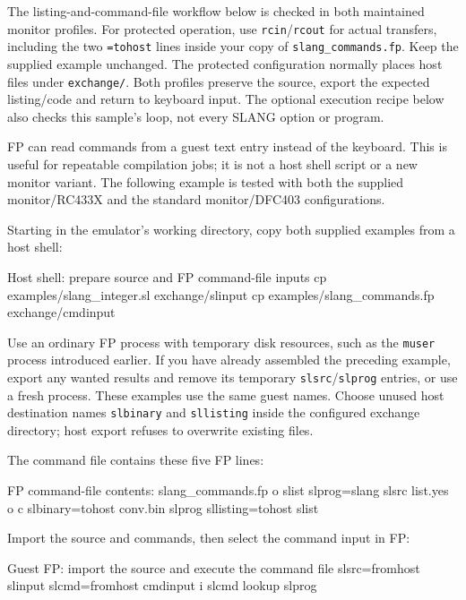 The listing-and-command-file workflow below is checked in both maintained
monitor profiles. For protected operation, use \texttt{rcin}/\texttt{rcout}
for actual transfers, including the two \texttt{=tohost} lines inside your
copy of \texttt{slang\_commands.fp}. Keep the supplied example unchanged.
The protected configuration normally places host files under
\texttt{exchange/}. Both profiles preserve the source, export the
expected listing/code and return to keyboard input. The optional execution
recipe below also checks this sample's loop, not every SLANG option or program.

FP can read commands from a guest text entry instead of the keyboard. This is useful for repeatable compilation jobs; it is not a host shell script or a new monitor variant. The following example is tested with both the supplied monitor/RC433X and the standard monitor/DFC403 configurations.

Starting in the emulator's working directory, copy both supplied examples from a host shell:

\begin{commandexample}[language=sh]{Host shell: prepare source and FP command-file inputs}
cp examples/slang_integer.sl exchange/slinput
cp examples/slang_commands.fp exchange/cmdinput
\end{commandexample}

Use an ordinary FP process with temporary disk resources, such as the \passthrough{\lstinline!muser!} process introduced earlier. If you have already assembled the preceding example, export any wanted results and remove its temporary \passthrough{\lstinline!slsrc!}/\passthrough{\lstinline!slprog!} entries, or use a fresh process. These examples use the same guest names. Choose unused host destination names \passthrough{\lstinline!slbinary!} and \passthrough{\lstinline!sllisting!} inside the configured exchange directory; host export refuses to overwrite existing files.

The command file contains these five FP lines:

\begin{commandexample}{FP command-file contents: slang\_commands.fp}
o slist
slprog=slang slsrc list.yes
o c
slbinary=tohost conv.bin slprog
sllisting=tohost slist
\end{commandexample}

Import the source and commands, then select the command input in FP:

\begin{commandexample}{Guest FP: import the source and execute the command file}
slsrc=fromhost slinput
slcmd=fromhost cmdinput
i slcmd
lookup slprog
\end{commandexample}

